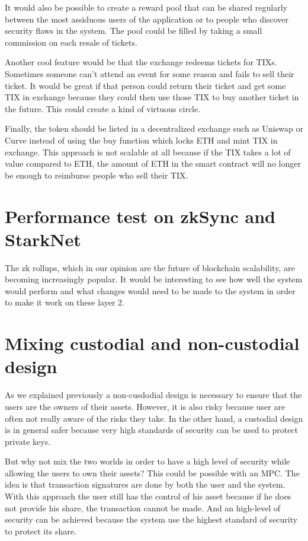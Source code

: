 \documentclass[a4paper,11pt,oneside]{report}
\begin{document}
It would also be possible to create a reward pool that can be shared regularly between the most assiduous users of the application or to people who discover security flaws in the system. The pool could be filled by taking a small commission on each resale of tickets.

Another cool feature would be that the exchange redeems tickets for TIXs. Sometimes someone can't attend an event for some reason and fails to sell their ticket. It would be great if that person could return their ticket and get some TIX in exchange because they could then use those TIX to buy another ticket in the future. This could create a kind of virtuous circle.

Finally, the token should be listed in a decentralized exchange such as Uniswap or Curve instead of using the buy function which locks ETH and mint TIX in exchange. This approach is not scalable at all because if the TIX takes a lot of value compared to ETH, the amount of ETH in the smart contract will no longer be enough to reimburse people who sell their TIX.

\section{Performance test on zkSync and StarkNet}
The zk rollups, which in our opinion are the future of blockchain scalability, are becoming increasingly popular. It would be interesting to see how well the system would perform and what changes would need to be made to the system in order to make it work on these layer 2.

\section{Mixing custodial and non-custodial design}
As we explained previously a non-cusdodial design is necessary to ensure that the users are the owners of their assets. However, it is also risky because user are often not really aware of the risks they take. In the other hand, a custodial design is in general safer because very high standards of security can be used to protect private keys.

But why not mix the two worlds in order to have a high level of security while allowing the users to own their assets? This could be possible with an MPC. The idea is that transaction signatures are done by both the user and the system. With this approach the user still has the control of his asset because if he does not provide his share, the transaction cannot be made. And an high-level of security can be achieved because the system use the highest standard of security to protect its share.
\end{document}
